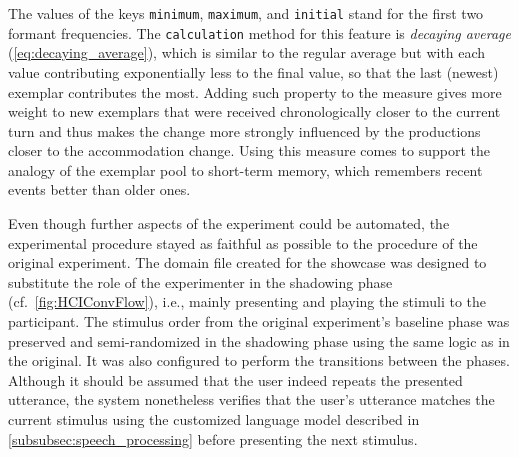 \noindent
The values of the keys \texttt{minimum}, \texttt{maximum}, and \texttt{initial} stand for the first two formant frequencies.
The \texttt{calculation} method for this feature is \emph{decaying average} (\cref{eq:decaying_average}), which is similar to the regular average but with each value contributing exponentially less to the final value, so that the last (newest) exemplar contributes the most.
Adding such property to the measure gives more weight to new exemplars that were received chronologically closer to the current turn and thus makes the change more strongly influenced by the productions closer to the accommodation change.
Using this measure comes to support the analogy of the exemplar pool to short-term memory, which remembers recent events better than older ones.

Even though further aspects of the experiment could be automated, the experimental procedure stayed as faithful as possible to the procedure of the original experiment.
The domain file created for the showcase was designed to substitute the role of the experimenter in the shadowing phase (cf.\ \cref{fig:HCIConvFlow}), i.e., mainly presenting and playing the stimuli to the participant.
The stimulus order from the original experiment's baseline phase was preserved and semi-randomized in the shadowing phase using the same logic as in the original.
It was also configured to perform the transitions between the phases.
Although it should be assumed that the user indeed repeats the presented utterance, the system nonetheless verifies that the user's utterance matches the current stimulus using the customized language model described in \cref{subsubsec:speech_processing} before presenting the next stimulus.


